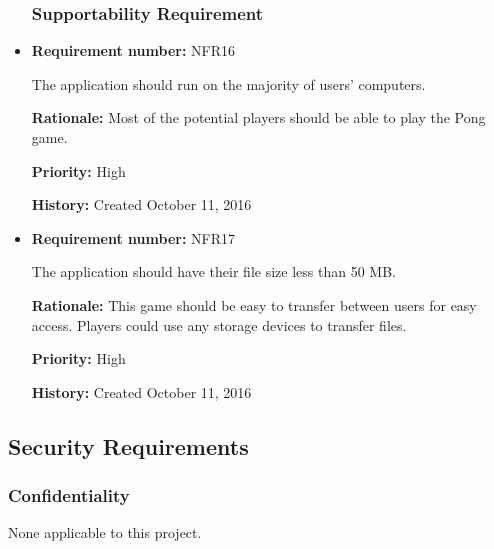 \documentclass[12pt,letterpaper]{article}
\begin{document}
\begin{reqbox}
	\begin{itemize}

\subsubsection{Supportability Requirement}

	\item \textbf{Requirement number: }NFR16
	
	 The application should run on the majority of users’ computers.

	\textbf{Rationale: }Most of the potential players should be able to play the Pong game. 
	
	\textbf{Priority: }High    

	\textbf{History: }Created October 11, 2016    

	\end{itemize}
\end{reqbox}

\begin{reqbox}
	\begin{itemize}

\subsubsection{Portability Requirement}
	\item \textbf{Requirement number: }NFR17

	The application should have their file size less than 50 MB.

	\textbf{Rationale: }This game should be easy to transfer between users for easy access. Players could use any storage devices to transfer files.

	\textbf{Priority: }High

	\textbf{History: }Created October 11, 2016
	\end{itemize}
\end{reqbox}

\subsection{Security Requirements}

\begin{reqbox}
	\begin{itemize}
\subsubsection{Confidentiality}
None applicable to this project.
	\end{itemize}
\end{reqbox}
\end{document}

